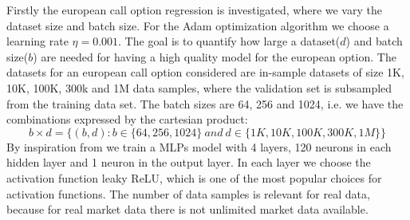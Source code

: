 Firstly the european call option regression is investigated, where we vary the dataset size and batch size. For the Adam optimization algorithm we choose a learning rate $\eta=0.001$. The goal is to quantify how large a dataset($d$) and batch size($b$) are needed for having a high quality model for the european option. The datasets for an european call option considered are in-sample datasets of size 1K, 10K, 100K, 300k and 1M data samples, where the validation set is subsampled from the training data set. The batch sizes are 64, 256 and 1024, i.e. we have the combinations expressed by the cartesian product:
$$b \times d = \{(b, d) : b \in \{64, 256, 1024\} \ and \ d \in\{1K,10K,100K,300K,1M \} \}$$
By inspiration from \parencite{HirsaAli2019} we train a MLPs model with 4 layers, 120 neurons in each hidden layer and 1 neuron in the output layer. In each layer we choose the activation function leaky ReLU, which is one of the most popular choices for activation functions. The number of data samples is relevant for real data, because for real market data there is not unlimited market data available.\\

